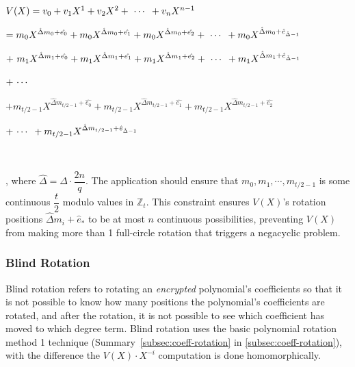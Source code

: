 \begin{tcolorbox}[title={\textbf{\tboxlabel{\ref*{subsec:tfhe-zero-padding}} Structure of Lookup Table Polynomial $\bm{V(X)}$}}]

$ $

$V(X) = v_0 + v_1X^1 + v_2X^2 + \text{ } \text{$\cdots$} \text{ } + v_nX^{n-1}$

\text{ } $= m_0X^{\hat{\Delta} m_0 + \hat{e_0}} + m_0X^{\hat{\Delta} m_0 + \hat{e_1}} + m_0X^{\hat{\Delta} m_0 + \hat{e_2}} + \text{ } \text{$\cdots$} \text{ } + m_0X^{\hat{\Delta} m_0 + \hat{e}_{\hat{\Delta} - 1}}$

\text{ } $ + \text{ } m_1X^{\hat{\Delta} m_1 + \hat{e_0}} + m_1X^{\hat{\Delta} m_1 + \hat{e_1}} + m_1X^{\hat{\Delta} m_1 + \hat{e_2}} + \text{ } \text{$\cdots$} \text{ } + m_1X^{\hat{\Delta} m_1 + \hat{e}_{\hat{\Delta} - 1}}$

\text{ } $ + \text{ } \text{$\cdots$} \text{ } $

\text{ } $ + m_{{t}/{2} - 1}X^{\hat{\Delta} m_{{t}/{2} - 1} + \hat{e_0}} + m_{{t}/{2} - 1}X^{\hat{\Delta} m_{{t}/{2} - 1} + \hat{e_1}} + m_{{t}/{2} - 1}X^{\hat{\Delta} m_{{t}/{2} - 1} + \hat{e_2}}$

\text{ } \text{ } $ + \text{ } \text{$\cdots$} \text{ } + m_{{t}/{2} - 1}X^{\hat{\Delta} m_{{t}/{2} - 1} + \hat{e}_{\hat{\Delta} - 1}}$

$ $

\noindent , where $\hat\Delta = \Delta \cdot \dfrac{2n}{q}$. The application should ensure that $m_0, m_1, \cdots, m_{t/2 - 1}$ is some continuous $\dfrac{t}{2}$ modulo values in $\mathbb{Z}_t$. This constraint ensures $V(X)$'s rotation positions $\hat{\Delta} m_i + \hat e_{*}$ to be at most $n$ continuous possibilities, preventing $V(X)$ from making more than 1 full-circle rotation that triggers a negacyclic problem. 


\end{tcolorbox}


\subsubsection{Blind Rotation}
\label{subsec:bootstrapping-blind-rotation} 

Blind rotation refers to rotating an \textit{encrypted} polynomial's coefficients so that it is not possible to know how many positions the polynomial's coefficients are rotated, and after the rotation, it is not possible to see which coefficient has moved to which degree term. Blind rotation uses the basic polynomial rotation method 1 technique (Summary~\ref*{subsec:coeff-rotation} in \autoref{subsec:coeff-rotation}), with the difference the $V(X)\cdot X^{-i}$ computation is done homomorphically. 

